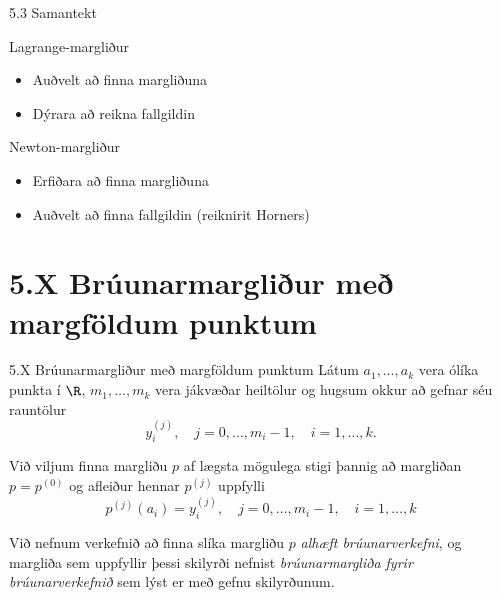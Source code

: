 \begin{frame}{5.3 Samantekt}
\begin{block}{Lagrange-margliður}
 \begin{itemize}
  \item Auðvelt að finna margliðuna
  \item Dýrara að reikna fallgildin
 \end{itemize}
\end{block}

\begin{block}{Newton-margliður}
 \begin{itemize}
  \item Erfiðara að finna margliðuna
  \item Auðvelt að finna fallgildin (reiknirit Horners)
 \end{itemize}

\end{block}

 
\end{frame}


\section*{5.X Brúunarmargliður með margföldum punktum} 

\begin{frame}{5.X Brúunarmargliður með margföldum punktum} 
Látum $a_1, \ldots, a_k$ vera ólíka punkta í $\R$, 
$m_1, \ldots, m_k$ vera jákvæðar heiltölur og hugsum okkur að gefnar 
séu rauntölur
\begin{equation*}
  y_i^{(j)}, \quad j = 0, \ldots, m_i-1, \quad i = 1, \ldots, k.
\end{equation*}

\pause
Við viljum finna margliðu $p$ af lægsta mögulega stigi þannig að
margliðan $p=p^{(0)}$ og afleiður hennar $p^{(j)}$ uppfylli
\begin{equation*}
  p^{(j)}(a_i) = y_i^{(j)}, 
  \quad j = 0, \ldots, m_i-1, \quad i = 1, \ldots, k
\end{equation*}

\pause
\smallskip
Við nefnum verkefnið að finna slíka margliðu $p$ 
{\em alhæft brúunarverkefni}, og margliða sem uppfyllir 
þessi skilyrði nefnist
{ \em brúunarmargliða fyrir brúunarverkefnið}
sem lýst er með gefnu skilyrðunum.  
\end{frame}

